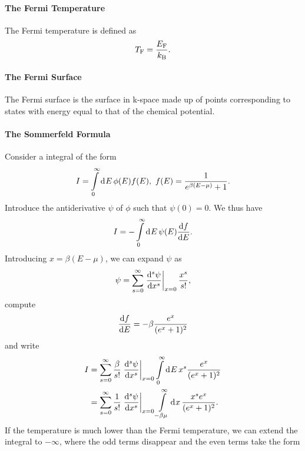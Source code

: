 \paragraph{The Fermi Temperature}
The Fermi temperature is defined as
\begin{align*}
	T_{\text{F}} = \frac{E_{\text{F}}}{k_{\text{B}}}.
\end{align*}

\paragraph{The Fermi Surface}
The Fermi surface is the surface in k-space made up of points corresponding to states with energy equal to that of the chemical potential.

\paragraph{The Sommerfeld Formula}
Consider a integral of the form
\begin{align*}
	I = \int\limits_{0}^{\infty}\dd[]{E}\phi(E)f(E),\ f(E) = \frac{1}{e^{\beta(E - \mu)} + 1}.
\end{align*}
Introduce the antiderivative $\psi$ of $\phi$ such that $\psi(0) = 0$. We thus have
\begin{align*}
	I = -\int\limits_{0}^{\infty}\dd[]{E}\psi(E)\dv{f}{E}.
\end{align*}
Introducing $x = \beta(E - \mu)$, we can expand $\psi$ as
\begin{align*}
	\psi = \sum\limits_{s = 0}^{\infty}\eval{\dv[s]{\psi}{x}}_{x = 0}\frac{x^{s}}{s!},
\end{align*}
compute
\begin{align*}
	\dv{f}{E} = -\beta\frac{e^{x}}{(e^{x} + 1)^{2}}
\end{align*}
and write
\begin{align*}
	I &= \sum\limits_{s = 0}^{\infty}\frac{\beta}{s!}\eval{\dv[s]{\psi}{x}}_{x = 0}\integ{0}{\infty}{E}{x^{s}\frac{e^{x}}{(e^{x} + 1)^{2}}} \\
	  &= \sum\limits_{s = 0}^{\infty}\frac{1}{s!}\eval{\dv[s]{\psi}{x}}_{x = 0}\integ{-\beta\mu}{\infty}{x}{\frac{x^{s}e^{x}}{(e^{x} + 1)^{2}}}.
\end{align*}
If the temperature is much lower than the Fermi temperature, we can extend the integral to $-\infty$, where the odd terms disappear and the even terms take the form
